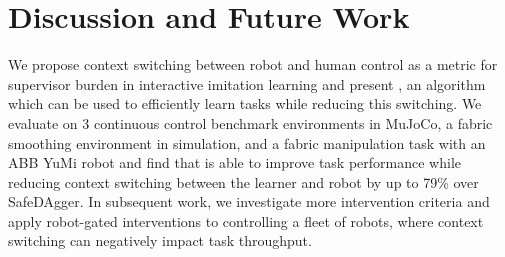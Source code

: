 \section{Discussion and Future Work}
\label{sec:discussion}
We propose context switching between robot and human control as a metric for supervisor burden in interactive imitation learning and present \algname, an algorithm which can be used to efficiently learn tasks while reducing this switching. We evaluate \algname on 3 continuous control benchmark environments in MuJoCo, a fabric smoothing environment in simulation, and a fabric manipulation task with an ABB YuMi robot and find that \algname is able to improve task performance while reducing context switching between the learner and robot by up to 79\% over SafeDAgger. %
In subsequent work, we investigate more intervention criteria and apply robot-gated interventions to controlling a fleet of robots, where context switching can negatively impact task throughput.

